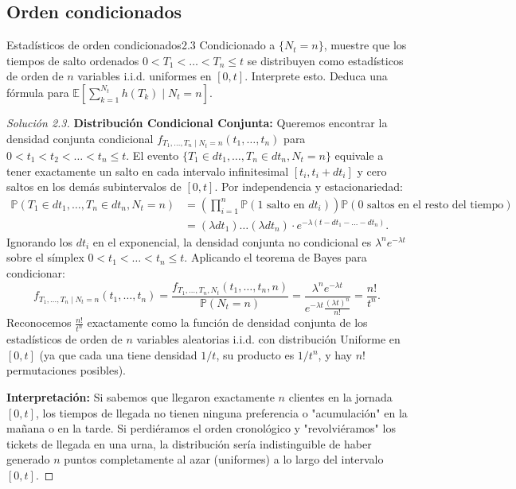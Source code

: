 \documentclass[10pt,a4paper]{article}
\begin{document}
\newpage
\subsection{Orden condicionados}

\begin{ejercicio}{Estadísticos de orden condicionados}{2.3}
    Condicionado a $\{N_t = n\}$, muestre que los tiempos de salto ordenados $0 < T_1 < \dots < T_n \le t$ se distribuyen como estadísticos de orden de $n$ variables i.i.d. uniformes en $[0, t]$. Interprete esto. Deduca una fórmula para $\mathbb{E}\left[ \sum_{k=1}^{N_t} h(T_k) \mid N_t = n \right]$.
\end{ejercicio}

\begin{proof}[Solución 2.3]
    \textbf{Distribución Condicional Conjunta:}
    Queremos encontrar la densidad conjunta condicional $f_{T_1,\dots,T_n \mid N_t=n}(t_1, \dots, t_n)$ para $0 < t_1 < t_2 < \dots < t_n \le t$.
    El evento $\{T_1 \in dt_1, \dots, T_n \in dt_n, N_t = n\}$ equivale a tener exactamente un salto en cada intervalo infinitesimal $[t_i, t_i+dt_i]$ y cero saltos en los demás subintervalos de $[0, t]$.
    Por independencia y estacionariedad:
    \begin{align*}
        \mathbb{P}(T_1 \in dt_1, \dots, T_n \in dt_n, N_t = n) &= \left( \prod_{i=1}^n \mathbb{P}(1 \text{ salto en } dt_i) \right) \mathbb{P}(0 \text{ saltos en el resto del tiempo}) \\
        &= (\lambda dt_1) \dots (\lambda dt_n) \cdot e^{-\lambda (t - dt_1 - \dots - dt_n)}.
    \end{align*}
    Ignorando los $dt_i$ en el exponencial, la densidad conjunta no condicional es $\lambda^n e^{-\lambda t}$ sobre el símplex $0 < t_1 < \dots < t_n \le t$.
    Aplicando el teorema de Bayes para condicionar:
    \[ f_{T_1,\dots,T_n \mid N_t=n}(t_1, \dots, t_n) = \frac{f_{T_1,\dots,T_n, N_t}(t_1, \dots, t_n, n)}{\mathbb{P}(N_t = n)} = \frac{\lambda^n e^{-\lambda t}}{e^{-\lambda t} \frac{(\lambda t)^n}{n!}} = \frac{n!}{t^n}. \]
    Reconocemos $\frac{n!}{t^n}$ exactamente como la función de densidad conjunta de los estadísticos de orden de $n$ variables aleatorias i.i.d. con distribución Uniforme en $[0, t]$ (ya que cada una tiene densidad $1/t$, su producto es $1/t^n$, y hay $n!$ permutaciones posibles).

    \textbf{Interpretación:}
    Si sabemos que llegaron exactamente $n$ clientes en la jornada $[0, t]$, los tiempos de llegada no tienen ninguna preferencia o "acumulación" en la mañana o en la tarde. Si perdiéramos el orden cronológico y "revolviéramos" los tickets de llegada en una urna, la distribución sería indistinguible de haber generado $n$ puntos completamente al azar (uniformes) a lo largo del intervalo $[0, t]$.


\end{proof}
\end{document}
